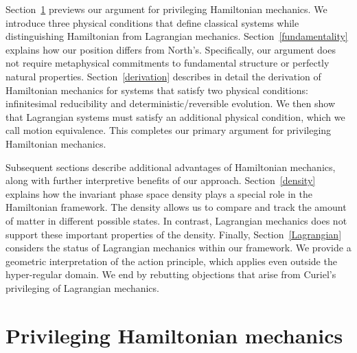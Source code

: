 \documentclass[12pt, english, twoside]{article} %
\begin{document}
Section~\ref{privileging} previews our argument for privileging Hamiltonian mechanics. We introduce three physical conditions that define classical systems while distinguishing Hamiltonian from Lagrangian mechanics. Section~\ref{fundamentality} explains how our position differs from North's. Specifically, our argument does not require metaphysical commitments to fundamental structure or perfectly natural properties. Section~\ref{derivation} describes in detail the derivation of Hamiltonian mechanics for systems that satisfy two physical conditions: infinitesimal reducibility and deterministic/reversible evolution. We then show that Lagrangian systems must satisfy an additional physical condition, which we call motion equivalence. This completes our primary argument for privileging Hamiltonian mechanics.

Subsequent sections describe additional advantages of Hamiltonian mechanics, along with further interpretive benefits of our approach. Section~\ref{density} explains how the invariant phase space density plays a special role in the Hamiltonian framework. The density allows us to compare and track the amount of matter in different possible states. In contrast, Lagrangian mechanics does not support these important properties of the density. Finally, Section~\ref{Lagrangian} considers the status of Lagrangian mechanics within our framework. We provide a geometric interpretation of the action principle, which applies even outside the hyper-regular domain. We end by rebutting objections that arise from Curiel's \parencites*[]{Curiel} privileging of Lagrangian mechanics. 



\section{Privileging Hamiltonian mechanics}
\label{privileging}
\end{document}

